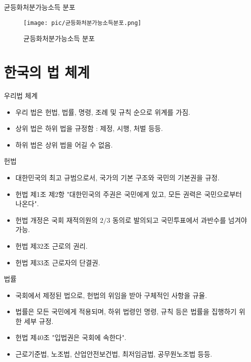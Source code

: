 \documentclass[aspectratio=169,xcolor=dvipsnames,handout]{beamer}
\begin{document}
\begin{frame}{균등화처분가능소득 분포}
\centering
\begin{figure}
    \texttt{[image: pic/균등화처분가능소득분포.png]}
    \caption{균등화처분가능소득 분포}
\end{figure}
\end{frame}

\section{한국의 법 체계}

\begin{frame}{우리법 체계}
    \begin{itemize}
        \item 우리 법은 헌법, 법률, 명령, 조례 및 규칙 순으로 위계를 가짐.
        \item 상위 법은 하위 법을 규정함 : 제정, 시행, 처벌 등등.
        \item 하위 법은 상위 법을 어길 수 없음.
    \end{itemize}
\end{frame}

\begin{frame}{헌법}
    \begin{itemize}
        \item 대한민국의 최고 규범으로서, 국가의 기본 구조와 국민의 기본권을 규정.
        \item 헌법 제1조 제2항 "대한민국의 주권은 국민에게 있고, 모든 권력은 국민으로부터 나온다".
        \item 헌법 개정은 국회 재적의원의 $2/3$ 동의로 발의되고 국민투표에서 과반수를 넘겨야 가능.
        \item 헌법 제32조 근로의 권리.
        \item 헌법 제33조 근로자의 단결권.
    \end{itemize}
\end{frame}

\begin{frame}{법률}
    \begin{itemize}
        \item 국회에서 제정된 법으로, 헌법의 위임을 받아 구체적인 사항을 규율.
        \item 법률은 모든 국민에게 적용되며, 하위 법령인 명령, 규칙 등은 법률을 집행하기 위한 세부 규정.
        \item 헌법 제40조 "입법권은 국회에 속한다".
        \item 근로기준법, 노조법, 산업안전보건법, 최저임금법, 공무원노조법 등등.
    \end{itemize}
\end{frame}
\end{document}
